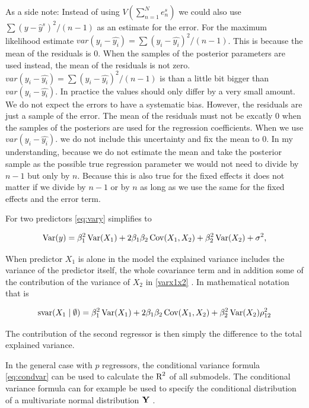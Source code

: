 \documentclass[11pt,a4paper,twoside]{book}\usepackage[]{graphicx}\usepackage[]{color}
\begin{document}
As a side note: Instead of using $V(\sum_{n=1}^{N}e^s_{n})$ we could also use $ \sum(y - \hat{y}^s)^2/(n-1) $ as an estimate for the error. For the maximum likelihood estimate $var(y_{i} - \hat{y_{i}}) = \sum (y_{i} - \hat{y_{i}})^2/ (n-1) $. This is because the mean of the residuals is 0. When the  samples of the posterior parameters are used instead, the mean of the residuals is not zero. $var(y_{i} - \hat{y_{i}}) = \sum (y_{i} - \hat{y_{i}})^2/ (n-1) $ is than a little bit bigger than $var(y_{i} - \hat{y_{i}}). $ In practice the values should only differ by a very small amount. We do not expect the errors to have a systematic bias. However, the residuals are just a sample of the error. The mean of the residuals must not be excatly 0 when the samples of the posteriors are used for the regression coefficients. When we use $var(y_{i} - \hat{y_{i}}). $ we do not include this uncertainty and fix the mean to 0. In my understanding, because we do not estimate the mean and take the posterior sample as the possible true regression parameter we would not need to divide by $n-1$ but only by $n$. Because this is also true for the fixed effects it does not matter if we divide by $n-1$ or by $n$ as long as we use the same for the fixed effects and the error term.  


For two predictors \eqref{eq:vary} simplifies to

      \begin{align} 
        \operatorname{Var}(y) = \beta_{1}^2 \operatorname{Var}(X_{1}) + 2  \beta_{1}  \beta_{2} \operatorname{Cov}(X_{1}, X_{2}) + \beta_{2}^2 \operatorname{Var}(X_{2}) + \sigma^2, \label{varx1x2} 
   \end{align}
 
 When predictor $X_{1}$ is alone in the model the explained variance includes the variance of the predictor itself, the whole covariance term and in addition some of the contribution of the variance of $X_{2}$ in \eqref{varx1x2} . In mathematical notation that is
 
      \begin{align} 
        \text{svar}({X_{1}} \mid \emptyset ) = \beta_{1}^2 \operatorname{Var}(X_{1}) + 2  \beta_{1}  \beta_{2} \operatorname{Cov}(X_{1}, X_{2}) + \beta_{2}^2 \operatorname{Var}(X_{2}) \rho_{12}^2 \nonumber 
   \end{align}
   
The contribution of the second regressor is then simply the difference to the total explained variance. 

In the general case with $p$ regressors, the conditional variance formula \eqref{eq:condvar} can be used to calculate the $\text{R}^2$ of all submodels. The conditional variance formula can for example be used to specify the conditional distribution of a multivariate normal distribution ${\mathbf{Y}}$ .
\end{document}
